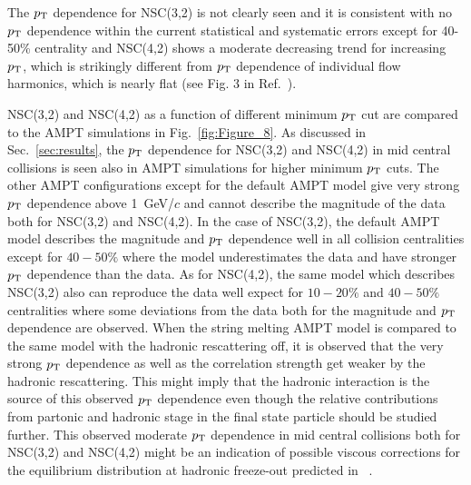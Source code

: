 \documentclass[ALICE,manyauthors]{cernphprep}
\begin{document}
The $p_{\rm T}$ dependence for NSC(3,2) is not clearly seen and it is consistent with no $p_{\rm T}$ dependence within the current statistical and systematic errors except for 40-50\% centrality
and NSC(4,2) shows a moderate decreasing trend for increasing $p_{\rm T}$, which is strikingly different from $p_{\rm T}$ dependence of individual flow harmonics, which is nearly flat (see Fig. 3 in Ref.~\cite{Abelev:2012di}).

NSC(3,2) and NSC(4,2) as a function of different minimum $p_{\rm T}$ cut are compared to the {AMPT} simulations in Fig.~\ref{fig:Figure_8}.
As discussed in Sec.~\ref{sec:results}, the $p_{\rm T}$ dependence for NSC(3,2) and NSC(4,2) in mid central collisions is seen also in AMPT simulations for higher minimum $p_{\rm T}$ cuts.
The other AMPT configurations except for the default AMPT model give very strong $p_{\rm T}$ dependence above 1~GeV/$c$ and cannot describe the magnitude of the data both for NSC(3,2) and NSC(4,2).
In the case of NSC(3,2), the default AMPT model describes the magnitude and $p_{\rm T}$ dependence well in all collision centralities except for $40-50\%$ where the model underestimates the data and have stronger $p_{\rm T}$ dependence than the data.
As for  NSC(4,2), the same model which describes NSC(3,2) also can reproduce the data well expect for $10-20\%$ and $40-50\%$ centralities where some deviations from the data both for the magnitude and $p_{\rm T}$ dependence are observed.
When the string melting AMPT model is compared to the same model with the hadronic rescattering off, it is observed that the very strong $p_{\rm T}$ dependence as well as the correlation strength get weaker by the hadronic rescattering.
This might imply that the hadronic interaction is the source of this observed $p_{\rm T}$ dependence even though the relative contributions from partonic and hadronic stage in the final state particle should be studied further.
This observed moderate $p_{\rm T}$ dependence in mid central collisions both for NSC(3,2) and NSC(4,2) might be an indication of possible viscous corrections for the equilibrium distribution at hadronic freeze-out predicted in ~\cite{Luzum:2010ad}.
\end{document}
